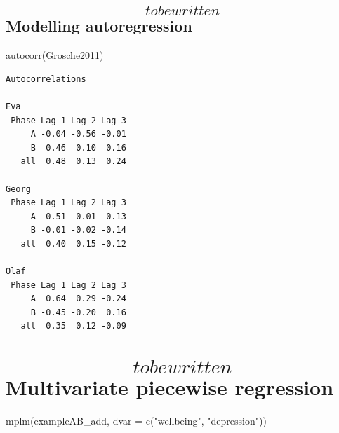 \documentclass[
]{book}
\newenvironment{Shaded}{\begin{snugshade}}{\end{snugshade}}
\newcommand{\AttributeTok}[1]{\textcolor[rgb]{0.77,0.63,0.00}{#1}}
\newcommand{\FunctionTok}[1]{\textcolor[rgb]{0.00,0.00,0.00}{#1}}
\newcommand{\NormalTok}[1]{#1}
\newcommand{\StringTok}[1]{\textcolor[rgb]{0.31,0.60,0.02}{#1}}
\begin{document}
\hypertarget{to-be-written-modelling-autoregression}{%
\subsection{\texorpdfstring{\[to be written\] Modelling autoregression}{to be written Modelling autoregression}}\label{to-be-written-modelling-autoregression}}

\begin{Shaded}
\begin{Highlighting}[]
\FunctionTok{autocorr}\NormalTok{(Grosche2011)}
\end{Highlighting}
\end{Shaded}

\begin{verbatim}
Autocorrelations

Eva 
 Phase Lag 1 Lag 2 Lag 3
     A -0.04 -0.56 -0.01
     B  0.46  0.10  0.16
   all  0.48  0.13  0.24

Georg 
 Phase Lag 1 Lag 2 Lag 3
     A  0.51 -0.01 -0.13
     B -0.01 -0.02 -0.14
   all  0.40  0.15 -0.12

Olaf 
 Phase Lag 1 Lag 2 Lag 3
     A  0.64  0.29 -0.24
     B -0.45 -0.20  0.16
   all  0.35  0.12 -0.09
\end{verbatim}

\hypertarget{to-be-written-multivariate-piecewise-regression}{%
\section{\texorpdfstring{\[to be written\] Multivariate piecewise regression}{to be written Multivariate piecewise regression}}\label{to-be-written-multivariate-piecewise-regression}}

\begin{Shaded}
\begin{Highlighting}[]
\FunctionTok{mplm}\NormalTok{(exampleAB\_add, }\AttributeTok{dvar =} \FunctionTok{c}\NormalTok{(}\StringTok{"wellbeing"}\NormalTok{, }\StringTok{"depression"}\NormalTok{))}
\end{Highlighting}
\end{Shaded}
\end{document}
